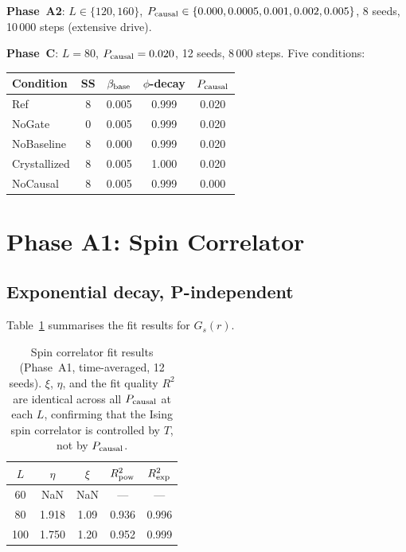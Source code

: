 \documentclass[12pt,a4paper]{article}
\begin{document}
\textbf{Phase~A2}: $L \in \{120, 160\}$,
$P_{\rm causal} \in \{0.000, 0.0005, 0.001, 0.002, 0.005\}$,
8 seeds, 10\,000 steps (extensive drive).

\textbf{Phase~C}: $L = 80$, $P_{\rm causal} = 0.020$, 12 seeds, 8\,000 steps.
Five conditions:
\begin{center}
\begin{tabular}{lcccc}
\toprule
Condition & SS & $\beta_{\rm base}$ & $\phi$-decay & $P_{\rm causal}$ \\
\midrule
Ref          & 8 & 0.005 & 0.999 & 0.020 \\
NoGate       & 0 & 0.005 & 0.999 & 0.020 \\
NoBaseline   & 8 & 0.000 & 0.999 & 0.020 \\
Crystallized & 8 & 0.005 & 1.000 & 0.020 \\
NoCausal     & 8 & 0.005 & 0.999 & 0.000 \\
\bottomrule
\end{tabular}
\end{center}

\section{Phase A1: Spin Correlator}

\subsection{Exponential decay, P-independent}

Table~\ref{tab:Gs} summarises the fit results for $G_s(r)$.

\begin{table}[h]
\centering
\caption{Spin correlator fit results (Phase~A1, time-averaged, 12 seeds).
$\xi$, $\eta$, and the fit quality $R^2$ are identical across all $P_{\rm causal}$
at each $L$, confirming that the Ising spin correlator is controlled by $T$,
not by $P_{\rm causal}$.}
\label{tab:Gs}
\begin{tabular}{ccccc}
\toprule
$L$ & $\eta$ & $\xi$ & $R^2_{\rm pow}$ & $R^2_{\rm exp}$ \\
\midrule
60  & NaN   & NaN  & ---   & --- \\
80  & 1.918 & 1.09 & 0.936 & 0.996 \\
100 & 1.750 & 1.20 & 0.952 & 0.999 \\
\bottomrule
\end{tabular}
\end{table}
\end{document}
